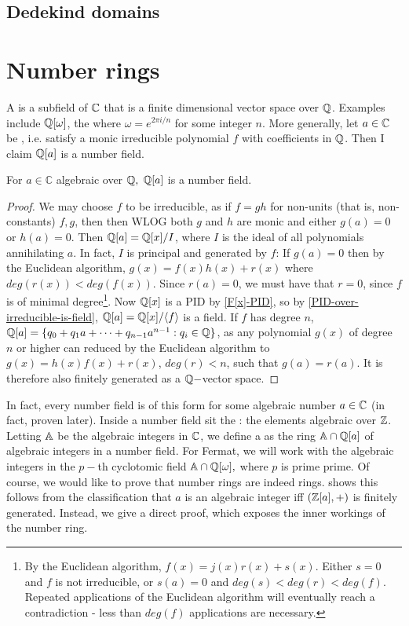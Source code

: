 \subsection{Dedekind domains}
\section{Number rings}
A  is a subfield of $\mathbb{C}$ that is a finite dimensional vector space over $\mathbb{Q}$. Examples include $\mathbb{Q}[\omega]$, the  where $\omega=e^{2\pi i/n}$ for some integer $n$. More generally, let $a\in\mathbb{C}$ be , i.e. satisfy a monic irreducible polynomial $f$ with coefficients in $\mathbb{Q}$. Then I claim $\mathbb{Q}[a]$ is a number field. 
\begin{lemma}
For $a\in \mathbb{C}$ algebraic over $\mathbb{Q},$ $\mathbb{Q}[a]$ is a number field.
\end{lemma}
\begin{proof}
We may choose $f$ to be irreducible, as if $f=gh$ for non-units (that is, non-constants) $f,g$, then  then WLOG both $g$ and $h$ are monic and either $g(a)=0$ or $h(a)=0$. Then $\mathbb{Q}[a]=\mathbb{Q}[x]/I$, where $I$ is the ideal of all polynomials annihilating $a$. In fact, $I$ is principal and generated by $f$: If $g(a)=0$ then by the Euclidean algorithm, $g(x)=f(x)h(x)+r(x)$ where $deg(r(x))<deg(f(x))$. Since $r(a)=0$, we must have that $r=0$, since $f$ is of minimal degree\footnote{By the Euclidean algorithm, $f(x)=j(x)r(x)+s(x)$. Either $s=0$ and $f$ is not irreducible, or $s(a)=0$ and $deg(s)<deg(r)<deg(f)$. Repeated applications of the Euclidean algorithm will eventually reach a contradiction - less than $deg(f)$ applications are necessary.}. Now $\mathbb{Q}[x]$ is a PID by \cref{F[x]-PID}, so by \cref{PID-over-irreducible-is-field}, $\mathbb{Q}[a]=\mathbb{Q}[x]/\langle f\rangle$ is a field. If $f$ has degree $n$, $\mathbb{Q}[a]=\{q_0+q_1a+\dots+q_{n-1}a^{n-1}:q_i\in \mathbb{Q}\}$, as any polynomial $g(x)$ of degree $n$ or higher can reduced by the Euclidean algorithm to $g(x)=h(x)f(x)+r(x)$, $deg(r)<n$, such that $g(a)=r(a)$. It is therefore also finitely generated as a $\mathbb{Q}-$vector space.
\end{proof}
In fact, every number field is of this form for some algebraic number $a\in\mathbb{C}$ \cite{NumberFields} (in fact, proven later). Inside a number field sit the : the elements algebraic over $\mathbb{Z}$. Letting $\mathbb{A}$ be the algebraic integers in $\mathbb{C}$, we define a  as the ring $\mathbb{A}\cap \mathbb{Q}[a]$ of algebraic integers in a number field. For Fermat, we will work with the algebraic integers in the $p-$th cyclotomic field $\mathbb{A}\cap \mathbb{Q}[\omega],$ where $p$ is prime prime. Of course, we would like to prove that number rings are indeed rings. \cite{NumberFields} shows this follows from the classification that $a$ is an algebraic integer iff $(\mathbb{Z}[a],+)$ is finitely generated. Instead, we give a direct proof, which exposes the inner workings of the number ring.

